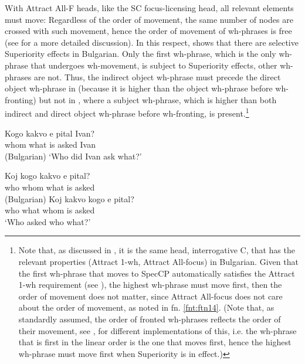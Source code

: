 \documentclass[output=paper,colorlinks,citecolor=brown]{langscibook}
\begin{document}
{\noindent With Attract All-F heads, like the SC focus-licensing head, all relevant elements must move: Regardless of the order of movement, the same number of nodes are crossed with such movement, hence the order of movement of wh-phrases is free (see \citealt{Bošković1999} for a more detailed discussion).} In this respect, \citet{Bošković2002} shows that there are selective Superiority effects in Bulgarian. Only the first wh-phrase, which is the only wh-phrase that undergoes wh-movement, is subject to Superiority effects, other wh-phrases are not. Thus, the indirect object wh-phrase must precede the direct object wh-phrase in  (because it is higher than the object wh-phrase before wh-fronting) but not in , where a subject wh-phrase, which is higher than both indirect and direct object wh-phrase before wh-fronting, is present.\footnote{\label{fnt:ftn15}Note that, as discussed in \citet{Bošković1999}, it is the same head, interrogative C, that has the relevant properties (Attract 1-wh, Attract All-focus) in Bulgarian. Given that the first wh-phrase that moves to SpecCP automatically satisfies the Attract 1-wh requirement (see \citealt{Bošković1999}), the highest wh-phrase must move first, then the order of movement does not matter, since Attract All-focus does not care about the order of movement, as noted in fn. \ref{fnt:ftn14}. (Note that, as standardly assumed, the order of fronted wh-phrases reflects the order of their movement, see \citet{bos:Rudin1988}, \citet{Richards2001} for different implementations of this, i.e. the wh-phrase that is first in the linear order is the one that moves first, hence the highest wh-phrase must move first when Superiority is in effect.)}

 
\ea\label{ex:bosk:32A}
\ea \label{ex:bosk:32Aa}
\gll Kogo  kakvo e  pital   Ivan? \\
whom what  is asked  Ivan\\\hfill (Bulgarian)
\label{ex:bosk:32Ab}
\z
`Who did Ivan ask what?'
\z 

\ea\label{ex:bosk:32B}
\ea \label{ex:bosk:32Ba}
\gll Koj kogo kakvo e  pital?\\
who whom  what   is asked\\\hfill (Bulgarian)
\ex \label{ex:bosk:32Bb}
\gll Koj kakvo kogo e pital?\\
who what whom is asked\\
\z 
`Who asked who what?'
\z 
\end{document}
